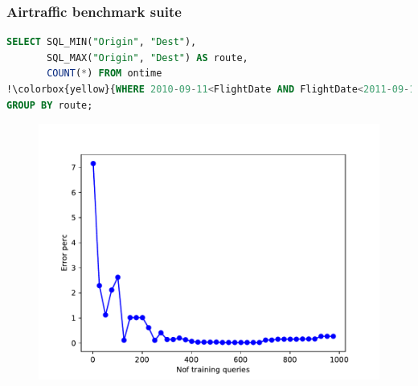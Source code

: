 \begin{frame}[fragile]
\frametitle{Airtraffic benchmark suite}
\begin{lstlisting}[basicstyle=\ttfamily\tiny, language=SQL,escapechar=!]
SELECT SQL_MIN("Origin", "Dest"),
       SQL_MAX("Origin", "Dest") AS route,
       COUNT(*) FROM ontime
!\colorbox{yellow}{WHERE 2010-09-11<FlightDate AND FlightDate<2011-09-11}!
GROUP BY route;
\end{lstlisting}
	\begin{figure}[!htb]
	    \includegraphics[scale=0.45]{../figs/airtraffic/airtraffic_sel11_error.pdf}
	\end{figure}
\end{frame}


